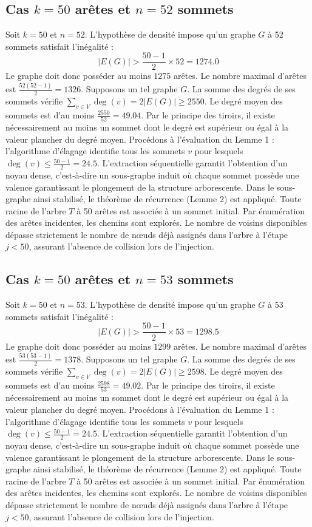 \documentclass[12pt,a4paper]{article}
\begin{document}
\subsection{Cas $k = 50$ arêtes et $n = 52$ sommets}
Soit $k = 50$ et $n = 52$. L'hypothèse de densité impose qu'un graphe $G$ à 52 sommets satisfait l'inégalité :
$$ |E(G)| > \frac{50-1}{2} \times 52 = 1274.0 $$
Le graphe doit donc posséder au moins $1275$ arêtes. Le nombre maximal d'arêtes est $\frac{52(52-1)}{2} = 1326$.
Supposons un tel graphe $G$. La somme des degrés de ses sommets vérifie $\sum_{v \in V} \deg(v) = 2|E(G)| \geq 2550$.
Le degré moyen des sommets est d'au moins $\frac{2550}{52} = 49.04$.
Par le principe des tiroirs, il existe nécessairement au moins un sommet dont le degré est supérieur ou égal à la valeur plancher du degré moyen.
Procédons à l'évaluation du Lemme 1 : l'algorithme d'élagage identifie tous les sommets $v$ pour lesquels $\deg(v) \leq \frac{50-1}{2} = 24.5$.
L'extraction séquentielle garantit l'obtention d'un noyau dense, c'est-à-dire un sous-graphe induit où chaque sommet possède une valence garantissant le plongement de la structure arborescente.
Dans le sous-graphe ainsi stabilisé, le théorème de récurrence (Lemme 2) est appliqué. Toute racine de l'arbre $T$ à 50 arêtes est associée à un sommet initial. Par énumération des arêtes incidentes, les chemins sont explorés. Le nombre de voisins disponibles dépasse strictement le nombre de nœuds déjà assignés dans l'arbre à l'étape $j < 50$, assurant l'absence de collision lors de l'injection.

\subsection{Cas $k = 50$ arêtes et $n = 53$ sommets}
Soit $k = 50$ et $n = 53$. L'hypothèse de densité impose qu'un graphe $G$ à 53 sommets satisfait l'inégalité :
$$ |E(G)| > \frac{50-1}{2} \times 53 = 1298.5 $$
Le graphe doit donc posséder au moins $1299$ arêtes. Le nombre maximal d'arêtes est $\frac{53(53-1)}{2} = 1378$.
Supposons un tel graphe $G$. La somme des degrés de ses sommets vérifie $\sum_{v \in V} \deg(v) = 2|E(G)| \geq 2598$.
Le degré moyen des sommets est d'au moins $\frac{2598}{53} = 49.02$.
Par le principe des tiroirs, il existe nécessairement au moins un sommet dont le degré est supérieur ou égal à la valeur plancher du degré moyen.
Procédons à l'évaluation du Lemme 1 : l'algorithme d'élagage identifie tous les sommets $v$ pour lesquels $\deg(v) \leq \frac{50-1}{2} = 24.5$.
L'extraction séquentielle garantit l'obtention d'un noyau dense, c'est-à-dire un sous-graphe induit où chaque sommet possède une valence garantissant le plongement de la structure arborescente.
Dans le sous-graphe ainsi stabilisé, le théorème de récurrence (Lemme 2) est appliqué. Toute racine de l'arbre $T$ à 50 arêtes est associée à un sommet initial. Par énumération des arêtes incidentes, les chemins sont explorés. Le nombre de voisins disponibles dépasse strictement le nombre de nœuds déjà assignés dans l'arbre à l'étape $j < 50$, assurant l'absence de collision lors de l'injection.
\end{document}
